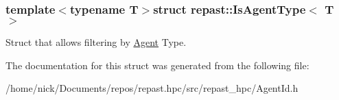 \subsubsection*{template$<$typename T$>$struct repast\-::\-Is\-Agent\-Type$<$ T $>$}

Struct that allows filtering by \hyperlink{classrepast_1_1_agent}{Agent} Type. 

The documentation for this struct was generated from the following file\-:\begin{DoxyCompactItemize}
\item 
/home/nick/\-Documents/repos/repast.\-hpc/src/repast\-\_\-hpc/Agent\-Id.\-h\end{DoxyCompactItemize}
